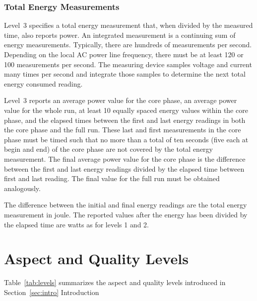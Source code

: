 \subsubsection{Total Energy Measurements}

\noindent
Level~3 specifies a total energy measurement that, when divided by the measured time, also reports power.
An integrated measurement is a continuing sum of energy measurements.
Typically, there are hundreds of measurements per second.
Depending on the local AC power line frequency, there must be at least 120 or 100 measurements per second.
The measuring device samples voltage and current many times per second and integrate those samples to determine the next total energy consumed reading.
\wl

\noindent
Level~3 reports an average power value for the core phase, an average power value for the whole run, at least 10 equally spaced energy values within the core phase, and the elapsed times between the first and last energy readings in both the core phase and the full run.
These last and first measurements in the core phase must be timed such that no more than a total of ten seconds (five each at begin and end) of the core phase are not covered by the total energy measurement.
The final average power value for the core phase is the difference between the first and last energy readings divided by the elapsed time between first and last reading.
The final value for the full run must be obtained analogously.
\wl

\noindent
The difference between the initial and final energy readings are the total energy measurement in joule.
The reported values after the energy has been divided by the elapsed time are watts as for levels 1 and 2.

\section{Aspect and Quality Levels}
\label{sec:AQLevels}
\noindent
Table~\ref{tab:levels} summarizes the aspect and quality levels introduced in Section~\ref{sec:intro} Introduction

